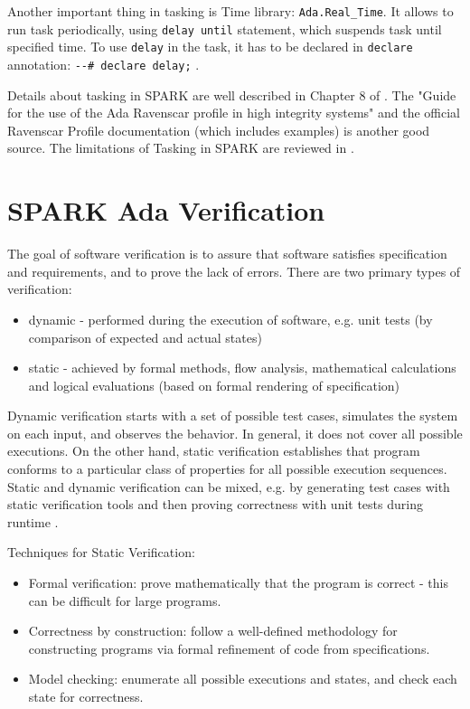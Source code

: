 Another important thing in tasking is Time library: \lstinline{Ada.Real_Time}. It allows to run task periodically, using \lstinline{delay until} statement, which suspends task until specified time. To use \lstinline{delay} in the task, it has to be declared in \lstinline{declare} annotation: \lstinline{--# declare delay;} \cite{Barnes:Book}.

Details about tasking in SPARK are well described in Chapter 8 of \cite{Barnes:Book}. The "Guide for the use of the Ada Ravenscar profile in high integrity systems" \cite{Ravenscar:Article} and the official Ravenscar Profile documentation (which includes examples) \cite{Ravenscar:Online} is another good source. The limitations of Tasking in SPARK are reviewed in \cite{IssuesWithRavenscar:Paper}.



\section{SPARK Ada Verification}
\label{background:sparkverification}


The goal of software verification is to assure that software satisfies specification and requirements, and to prove the lack of errors. There are two primary types of verification:
\begin{itemize}
	\item dynamic - performed during the execution of software, e.g. unit tests (by comparison of expected and actual states)
	\item static - achieved by formal methods, flow analysis, mathematical calculations and logical evaluations (based on formal rendering of specification)
\end{itemize}

Dynamic verification starts with a set of possible test cases, simulates the system on each input, and observes the behavior. In general, it does not cover all possible executions. On the other hand, static verification establishes that program conforms to a particular class of properties for all possible execution sequences. Static and dynamic verification can be mixed, e.g. by generating test cases with static verification tools and then proving correctness with unit tests during runtime \cite{KUnit:Paper}.

Techniques for Static Verification:
\begin{itemize}
	\item Formal verification: prove mathematically that the program is correct - this can be difficult for large programs.
	\item Correctness by construction: follow a well-defined methodology for constructing programs via formal refinement of code from specifications.
	\item Model checking: enumerate all possible executions and states, and check each state for correctness.
\end{itemize}

